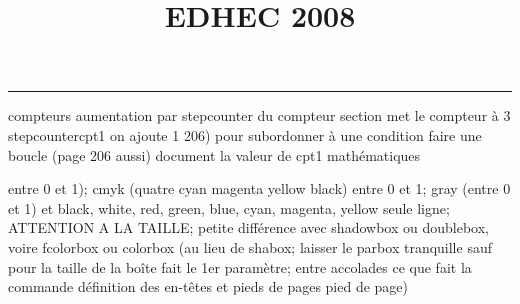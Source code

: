 \documentclass[11pt]{article}%
\title{\bf \vspace{-2cm} EDHEC 2008} %
\author{} %
\date{} %
\renewcommand{\headrulewidth}{0pt}%
\renewcommand{\footrulewidth}{0.4pt}%
\begin{document}
\maketitle %
\vspace{-1.4cm}\hrule %
\thispagestyle{fancy}

\vspace*{.2cm}



compteurs%
aumentation par stepcounter du compteur section%
met le compteur à 3%
stepcounter{cpt1} on ajoute 1%
206) pour subordonner à une condition %
faire une boucle (page 206 aussi) %
document la valeur de cpt1 
mathématiques\newcommand{\ch}{\operatorname{ch}} 
\newcommand{\sh}{\operatorname{sh}}
\renewcommand{\tanh}{\operatorname{th}}
\renewcommand{\sinh}{\operatorname{sh}}
\renewcommand{\cosh}{\operatorname{ch}}
\newcommand{\argsh}{\operatorname{argsh}}
\newcommand{\argch}{\operatorname{argch}}
\newcommand{\argth}{\operatorname{argth}}
\newcommand{\ker}{\operatorname{Ker}}
\renewcommand{\im}{\operatorname{Im}}
\newcommand{\rg}{\operatorname{rg}}
\newcommand{\Id}{\operatorname{Id}}
\newcommand{\id}{\operatorname{id}}
\renewcommand{\leq}{\leq}
\renewcommand{\geq}{\geq }

entre 0 et 1); cmyk (quatre cyan magenta yellow black) entre 0 et 1;
gray (entre 0 et 1) et black, white, red, green, blue, cyan, magenta,
yellow%
seule ligne; ATTENTION A LA TAILLE; petite différence avec shadowbox ou
doublebox, voire fcolorbox ou colorbox (au lieu de shabox; laisser le
parbox tranquille sauf pour la taille de la boîte
\newcommand{\Tbox}[1]{\begin{center} \shabox{\parbox{0.6
\linewidth}{#1}} \end{center}} %
fait le 1er paramètre; entre accolades ce que fait la commande
définition des en-têtes et pieds de pages\pagestyle{fancy}
\chead{}
\rfoot[ \ \thepage]{\thepage}
\cfoot{}
\lfoot{}
\thispagestyle{fancy} %
pied de page)\renewcommand{\footrulewidth}{0.4pt}
\renewcommand{\headrulewidth}{0.4pt}
\end{document}
